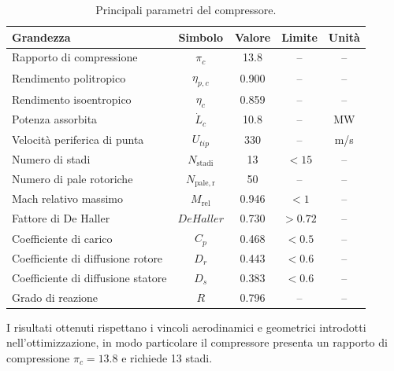 \begin{table}[H]
    \centering
    \caption{Principali parametri del compressore.}
    \label{tab:compressore_risultati}
    \fontsize{11pt}{11pt}\selectfont
    \renewcommand{\arraystretch}{1}
    \begin{tabular}{lcccc}
        \toprule
        \textbf{Grandezza} &
        \textbf{Simbolo} &
        \textbf{Valore} &
        \textbf{Limite} &
        \textbf{Unità} \\
        \midrule

        Rapporto di compressione
        & $\pi_c$ & 13.8 & -- & -- \\

        Rendimento politropico
        & $\eta_{p,c}$ & 0.900 & -- & -- \\

        Rendimento isoentropico
        & $\eta_c$ & 0.859 & -- & -- \\

        Potenza assorbita
        & $\dot{L}_c$ & 10.8 & -- & MW \\

        Velocità periferica di punta
        & $U_{tip}$ & 330 & -- & m/s \\

        Numero di stadi
        & $N_{\mathrm{stadi}}$ & 13 & $<15$ & -- \\

        Numero di pale rotoriche
        & $N_{\mathrm{pale,r}}$ & 50 & -- & -- \\

        \midrule

        Mach relativo massimo
        & $M_{\mathrm{rel}}$ & 0.946 & $<1$ & -- \\

        Fattore di De Haller
        & $DeHaller$ & 0.730 & $>0.72$ & -- \\

        Coefficiente di carico
        & $C_p$ & 0.468 & $<0.5$ & -- \\

        Coefficiente di diffusione rotore
        & $D_r$ & 0.443 & $<0.6$ & -- \\

        Coefficiente di diffusione statore
        & $D_s$ & 0.383 & $<0.6$ & -- \\

        Grado di reazione
        & $R$ & 0.796 & -- & -- \\

        \bottomrule
    \end{tabular}
\end{table}



I risultati ottenuti rispettano i vincoli aerodinamici e geometrici
introdotti nell'ottimizzazione, in modo particolare il compressore presenta un rapporto di compressione
$\pi_c=13.8$ e richiede 13 stadi.























